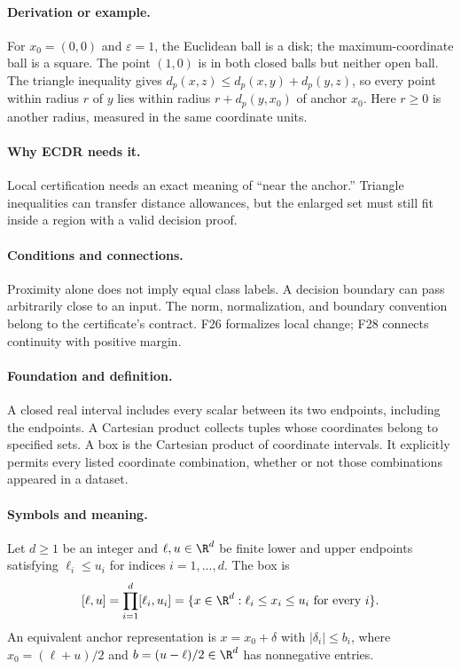 \paragraph{Derivation or example.}
For $x_0=(0,0)$ and $\varepsilon=1$, the Euclidean ball is a disk;
the maximum-coordinate ball is a square. The point $(1,0)$ is in both
closed balls but neither open ball. The triangle inequality gives
$d_p(x,z)\le d_p(x,y)+d_p(y,z)$, so every point within radius
$r$ of $y$ lies within radius $r+d_p(y,x_0)$ of anchor $x_0$.
Here $r\ge0$ is another radius, measured in the same coordinate units.
\paragraph{Why ECDR needs it.}
Local certification needs an exact meaning of ``near the anchor.''
Triangle inequalities can transfer distance allowances, but the enlarged
set must still fit inside a region with a valid decision proof.
\paragraph{Conditions and connections.}
Proximity alone does not imply equal class labels. A decision boundary
can pass arbitrarily close to an input. The norm, normalization, and
boundary convention belong to the certificate's contract. F26 formalizes
local change; F28 connects continuity with positive margin.

\paragraph{Foundation and definition.}
A closed real interval includes every scalar between its two endpoints,
including the endpoints. A Cartesian product collects tuples whose
coordinates belong to specified sets. A box is the Cartesian product
of coordinate intervals. It explicitly permits every listed coordinate
combination, whether or not those combinations appeared in a dataset.
\paragraph{Symbols and meaning.}
Let $d\ge1$ be an integer and $\ell,u\in\R^d$ be finite lower and
upper endpoints satisfying $\ell_i\le u_i$ for indices
$i=1,\ldots,d$. The box is
\[
 [\ell,u]=\prod_{i=1}^{d}[\ell_i,u_i]
 =\{x\in\R^d:\ell_i\le x_i\le u_i\text{ for every }i\}.
\]
An equivalent anchor representation is $x=x_0+\delta$ with
$|\delta_i|\le b_i$, where $x_0=(\ell+u)/2$ and
$b=(u-\ell)/2\in\R^d$ has nonnegative entries.
